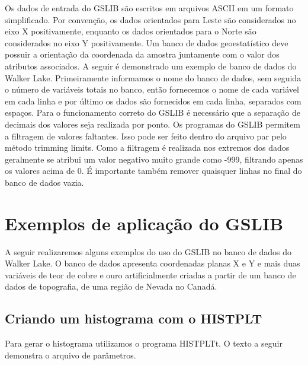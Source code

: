 Os dados de entrada do GSLIB são escritos em arquivos ASCII em um formato simplificado. Por convenção, os dados orientados para Leste são considerados no eixo X positivamente, enquanto os dados orientados para o Norte são considerados no eixo Y positivamente. Um banco de dados geoestatístico deve possuir a orientação da coordenada da amostra juntamente com o valor dos atributos associados. A seguir é demonstrado um exemplo de banco de dados do Walker Lake. Primeiramente informamos o nome do banco de dados, sem seguida o número de variáveis totais no banco, então fornecemos o nome de cada variável em cada linha e por último os dados são fornecidos em cada linha, separados com espaços. Para o funcionamento correto do GSLIB é necessário que a separação de decimais dos valores seja realizada por ponto. Os programas do GSLIB permitem a filtragem de valores faltantes. Isso pode ser feito dentro do arquivo par pelo método trimming limits. Como a filtragem é realizada nos extremos dos dados geralmente  se atribui um valor negativo muito grande como -999, filtrando apenas os valores acima de 0. É importante também remover quaisquer linhas no final do banco de dados vazia. 

\begin{small}
\begingroup
{}

\endgroup
\end{small}

\section{Exemplos de aplicação do GSLIB} 

A seguir realizaremos alguns exemplos do uso do GSLIB no banco de dados do Walker Lake. O banco de dados apresenta coordenadas planas X e Y e mais duas variáveis de teor de cobre e ouro artificialmente criadas a partir de um banco de dados de topografia, de uma região de Nevada no Canadá. 

\subsection{Criando um histograma com o HISTPLT}

Para gerar o histograma utilizamos o programa HISTPLTt. O texto a seguir demonstra o arquivo de parâmetros. 

\begin{small} 
\begingroup
{}

\endgroup
\end{small}
 
